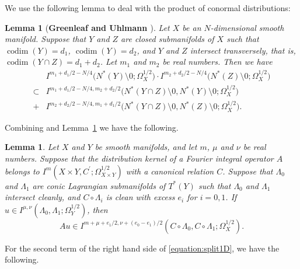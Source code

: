 \documentclass[a4paper,11pt,reqno]{amsart}
\numberwithin{equation}{section}
\newtheorem{lemma}[theorem]{Lemma}
\theoremstyle{definition}
\theoremstyle{remark}
\begin{document}
%  
We use the following lemma to deal with the product of conormal distributions:
%
%
\begin{lemma}[{\bf Greenleaf and Uhlmann \cite[Lemma~1.1]{GreenleafUhlmann}}]
\label{theorem:6-4} 
Let $X$ be an $N$-dimensional smooth manifold. 
Suppose that $Y$ and $Z$ are closed submanifolds of $X$ such that 
$\operatorname{codim}(Y)=d_1$, $\operatorname{codim}(Y)=d_2$, and 
$Y$ and $Z$ intersect transversely, that is, $\operatorname{codim}(Y{\cap}Z)=d_1+d_2$. 
Let $m_1$ and $m_2$ be real numbers. 
Then we have 
%
%
\begin{align}
& I^{m_1+d_1/2-N/4}\bigl(N^\ast(Y)\setminus0; \Omega_X^{1/2}\bigr)
  \cdot
  I^{m_2+d_2/2-N/4}\bigl(N^\ast(Z)\setminus0; \Omega_X^{1/2}\bigr)
\nonumber
\\
  \subset
& I^{m_1+d_1/2-N/4, m_2+d_2/2}\bigl(N^\ast(Y{\cap}Z)\setminus0, N^\ast(Y)\setminus0; \Omega_X^{1/2}\bigr)
\nonumber
\\
  +
& I^{m_2+d_2/2-N/4, m_1+d_1/2}\bigl(N^\ast(Y{\cap}Z)\setminus0, N^\ast(Z)\setminus0; \Omega_X^{1/2}\bigr).
\label{equation:productconormal}
\end{align}
%
%   
\end{lemma}
%
%
Combining \cite[Theorem~25.2.3]{Hoermander4} and Lemma~\ref{theorem:6-4}  
we have the following. 
%
%
\begin{lemma}
\label{theorem:6-5}
Let $X$ and $Y$ be smooth manifolds, and let $m$, $\mu$ and $\nu$ be real numbers. 
Suppose that the distribution kernel of a Fourier integral operator $A$ belongs to 
$I^m(X{\times}Y,C^\prime; \Omega_{X{\times}Y}^{1/2})$ with a canonical relation $C$. 
Suppose that $\Lambda_0$ and $\Lambda_1$ are conic Lagrangian submanifolds of $T^\ast(Y)$ such that 
$\Lambda_0$ and $\Lambda_1$ intersect cleanly, and $C\circ\Lambda_i$ 
is clean with excess $e_i$ for $i=0,1$. 
If $u \in I^{\mu, \nu}(\Lambda_0, \Lambda_1; \Omega_Y^{1/2})$, then 
%
%
$$
Au 
\in 
I^{m+\mu+e_1/2, \nu+(e_0-e_1)/2}(C\circ\Lambda_0, C\circ\Lambda_1; \Omega_X^{1/2}). 
$$
%
%
\end{lemma}
%
%
For the second term of the right hand side of \eqref{equation:split1D}, we have the following.
%
%
\end{document}
